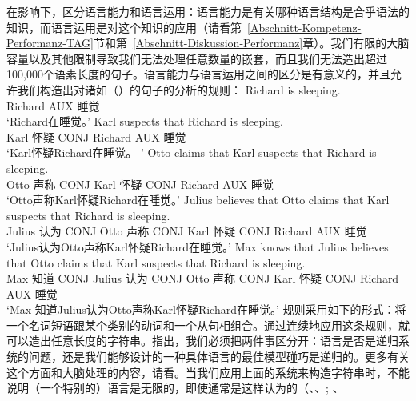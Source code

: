 \citet[Section~I.1]{Chomsky65a}在\citet{Saussure16a}\nocite{Saussure16a-Fr}影响下，区分语言能力和语言运用：语言能力是有关哪种语言结构是合乎语法的知识，而语言运用是对这个知识的应用（请看第~\ref{Abschnitt-Kompetenz-Performanz-TAG}节和第~\ref{Abschnitt-Diskussion-Performanz}章）。我们有限的大脑容量以及其他限制导致我们无法处理任意数量的嵌套，而且我们无法造出超过100,000个语素长度的句子。语言能力与语言运用之间的区分是有意义的，并且允许我们构造出对诸如（）的句子的分析的规则：
\eal 
\label{Beispiel-Satzeinbettung}
\ex 
\gll Richard is sleeping.\\
Richard AUX 睡觉\\
\glt `Richard在睡觉。'
\ex 
\gll Karl suspects that Richard is sleeping.\\
Karl 怀疑 CONJ Richard AUX 睡觉\\
\glt `Karl怀疑Richard在睡觉。 '
\ex 
\gll Otto claims that Karl suspects that Richard is sleeping.\\
Otto 声称 CONJ Karl 怀疑 CONJ Richard AUX 睡觉\\
\glt `Otto声称Karl怀疑Richard在睡觉。'
\ex 
\gll Julius believes that Otto claims that Karl suspects that Richard is sleeping.\\
Julius 认为 CONJ Otto 声称 CONJ Karl 怀疑 CONJ Richard AUX 睡觉\\
\glt `Julius认为Otto声称Karl怀疑Richard在睡觉。'
\ex 
\gll Max knows that Julius believes that Otto claims that Karl suspects that Richard is sleeping.\\
Max 知道 CONJ Julius 认为 CONJ Otto 声称 CONJ Karl 怀疑 CONJ Richard AUX 睡觉\\
\glt `Max 知道Julius认为Otto声称Karl怀疑Richard在睡觉。'
\zl
规则采用如下的形式：将一个名词短语跟某个类别的动词和一个从句相组合。通过连续地应用这条规则，就可以造出任意长度的字符串。\citet{PS2010a}指出，我们必须把两件事区分开：语言是否是递归系统的问题，还是我们能够设计的一种具体语言的最佳模型碰巧是递归的。更多有关这个方面和大脑处理的内容，请看。当我们应用上面的系统来构造字符串时，不能说明（一个特别的）语言是无限的，即使通常是这样认为的（\citealp[--106]{Bierwisch66a}、\citealp[]{Pinker94a}、\citealp*[]{HCF2002a}; \citealp[]{MuellerLehrbuch1}、
